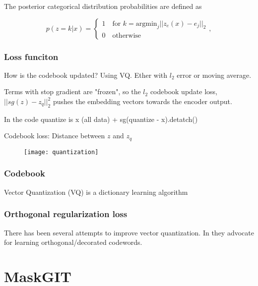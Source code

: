 \documentclass[../../thesis.tex]{subfiles}
\begin{document}
The posterior categorical distribution probabilities are defined as

\begin{equation}
    p(z=k | x) = 
    \begin{cases} 
        1 \quad \text{for }k = \textrm{argmin}_j||z_e(x) - e_j||_2 \\
        0 \quad \text{otherwise}
    \end{cases},
\end{equation}


\subsubsection{Loss funciton}


How is the codebook updated? Using VQ. Ether with $l_2$ error or moving average. 

Terms with stop gradient are "frozen", so the $l_2$ codebook update loss, $||sg(z) - z_q ||_2^2$ pushes the embedding vectors towards the encoder output. 

In the code quantize is x (all data) + sg(quantize - x).detatch()



Codebook loss: Distance between $z$ and $z_q$ 


\begin{figure}[h]
    \texttt{[image: quantization]}
    \centering    
\end{figure}





\subsubsection{Codebook}
Vector Quantization (VQ) is a dictionary learning algorithm 

\subsubsection{Orthogonal regularization loss}
There has been several attempts to improve vector quantization. In \cite{shin2023exploration} they advocate for learning orthogonal/decorated codewords. 




\section{MaskGIT}
\end{document}

